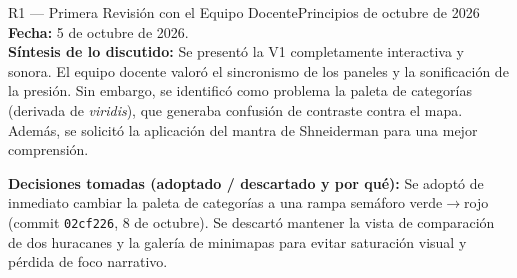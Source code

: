 \documentclass[11pt,a4paper]{article}
\begin{document}
	\begin{revisionbox}{R1 — Primera Revisión con el Equipo Docente}{Principios de octubre de 2026}
		\noindent\textbf{Fecha:} 5 de octubre de 2026.\\
		\textbf{Síntesis de lo discutido:} Se presentó la V1 completamente interactiva y sonora. El equipo docente valoró el sincronismo de los paneles y la sonificación de la presión. Sin embargo, se identificó como problema la paleta de categorías (derivada de \textit{viridis}), que generaba confusión de contraste contra el mapa. Además, se solicitó la aplicación del mantra de Shneiderman para una mejor comprensión.
		
		\vspace{0.15cm}
		\noindent\textbf{Decisiones tomadas (adoptado / descartado y por qué):}
		Se adoptó de inmediato cambiar la paleta de categorías a una rampa semáforo verde$\to$rojo (commit \texttt{02cf226}, 8 de octubre). Se descartó mantener la vista de comparación de dos huracanes y la galería de minimapas para evitar saturación visual y pérdida de foco narrativo.
	\end{revisionbox}
	
	\vspace{0.4cm}
	
\end{document}
